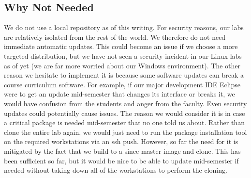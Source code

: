 \subsection{Why Not Needed}
We do not use a local repository as of this writing.  For security reasons, our labs are relatively isolated from the rest of the world.  We therefore do not need immediate automatic updates.  This could become an issue if we choose a more targeted distribution, but we have not seen a security incident in our Linux labs as of yet (we are far more worried about our Windows environment).  The other reason we hesitate to implement it is because some software updates can break a course curriculum software.  For example, if our major development IDE Eclipse were to get an update mid-semester that changes its interface or breaks it, we would have confusion from the students and anger from the faculty.  Even security updates could potentially cause issues.  The reason we would consider it is in case a critical package is needed mid-semester that no one told us about.  Rather than clone the entire lab again, we would just need to run the package installation tool on the required workstations via an ssh push.  However, so far the need for it is mitigated by the fact that we build to a since master image and clone. This has been sufficient so far, but it would be nice to be able to update mid-semester if needed without taking down all of the workstations to perform the cloning. 
